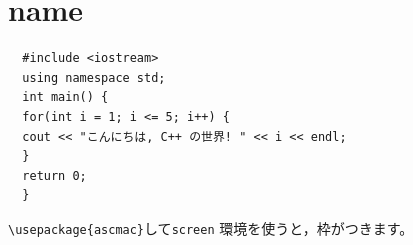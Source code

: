 \documentclass[a4paper,12pt]{jsarticle}
\begin{document}




\appendix

\part{name}
\begin{verbatim}
  #include <iostream>
  using namespace std;
  int main() {
  for(int i = 1; i <= 5; i++) {
  cout << "こんにちは, C++ の世界! " << i << endl;
  }
  return 0;
  }
\end{verbatim}
\verb|\usepackage{ascmac}|して\verb|screen| 環境を使うと，枠がつきます。
\end{document}
